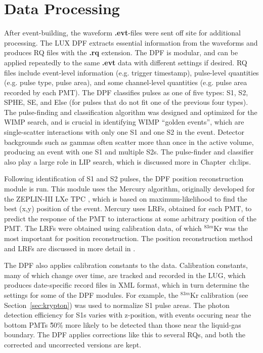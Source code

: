 \section{Data Processing}
After event-building, the waveform \textbf{.evt}-files were sent off site for additional processing. The \ac{LUX} \ac{DPF} extracts essential information from the waveforms and produces \ac{RQ} files with the \textbf{.rq} extension. The \ac{DPF} is modular, and can be applied repeatedly to the same \textbf{.evt} data with different settings if desired. \ac{RQ} files include event-level information (e.g. trigger timestamp), pulse-level quantities (e.g. pulse type, pulse area), and some channel-level quantities (e.g. pulse area recorded by each \ac{PMT}). The \ac{DPF} classifies pulses as one of five types: S1, S2, \ac{SPHE}, \ac{SE}, and Else (for pulses that do not fit one of the previous four types). The pulse-finding and classification algorithm was designed and optimized for the \ac{WIMP} search, and is crucial in identifying \ac{WIMP} ``golden events'', which are single-scatter interactions with only one S1 and one S2 in the event. Detector backgrounds such as gammas often scatter more than once in the active volume, producing an event with one S1 and multiple S2s. The pulse-finder and classifier also play a large role in \ac{LIP} search, which is discussed more in Chapter~{ch:lips}. 

Following identification of S1 and S2 pulses, the \ac{DPF} position reconstruction module is run. This module uses the Mercury algorithm, originally developed for the ZEPLIN-III \ac{LXe} \ac{TPC} \cite{Currie2012}, which is based on maximum-likelihood to find the best (x,y) position of the event. Mercury uses \ac{LRF}s, obtained for each \ac{PMT}, to predict the response of the \ac{PMT} to interactions at some arbitrary position of the \ac{PMT}. The \ac{LRF}s were obtained using calibration data, of which $^{83m}$Kr was the most important for position reconstruction. The position reconstruction method and \ac{LRF}s are discussed in more detail in \cite{LUXPositionReconstruction}.


The \ac{DPF} also applies calibration constants to the data. Calibration constants, many of which change over time, are tracked and recorded in the \ac{LUG}, which produces date-specific record files in XML format, which in turn determine the settings for some of the \ac{DPF} modules. For example, the $^{83m}$Kr calibration (see Section~\ref{sec:krypton}) was used to normalize S1 pulse areas. The photon detection efficiency for S1s varies with z-position, with events occuring near the bottom \ac{PMT}s \~50\% more likely to be detected than those near the liquid-gas boundary. The \ac{DPF} applies corrections like this to several RQs, and both the corrected and uncorrected versions are kept. 


